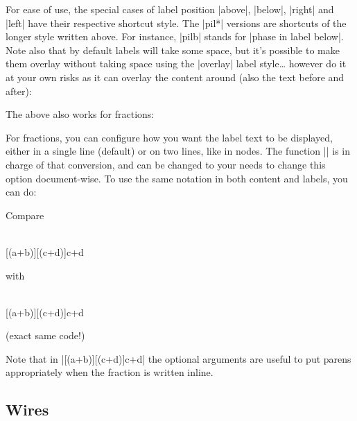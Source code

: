 \documentclass[a4paper]{ltxdoc}
\begin{document}
\begin{pgfmanualentry}
For ease of use, the special cases of label position |above|, |below|, |right| and |left| have their respective shortcut style. The |pil*| versions are shortcuts of the longer style written above. For instance, |pilb| stands for |phase in label below|. Note also that by default labels will take some space, but it's possible to make them overlay without taking space using the |overlay| label style\dots{} however do it at your own risks as it can overlay the content around (also the text before and after):
\begin{codeexample}[width=0pt]
  \zx{
    \zxZ[pilb]{\alpha+\beta} \rar & \zxX[pilb]{\gamma} \rar & \zxZ[pilb=overlay]{\gamma+\eta}
  }
\end{codeexample}
The above also works for fractions:
\begin{codeexample}[]
\end{codeexample}
For fractions, you can configure how you want the label text to be displayed, either in a single line (default) or on two lines, like in nodes. The function |\zxConvertToFracInLabel| is in charge of that conversion, and can be changed to your needs to change this option document-wise. To use the same notation in both content and labels, you can do:
\begin{codeexample}[width=0pt]
  Compare
  \begin{ZX}
     \dar \\
    [(a+b)][(c+d)]{c+d}
  \end{ZX} with
{
  \begin{ZX}
     \dar \\
    [(a+b)][(c+d)]{c+d}
  \end{ZX} (exact same code!)
}
\end{codeexample}
Note that in |[(a+b)][(c+d)]{c+d}| the optional arguments are useful to put parens appropriately when the fraction is written inline.
\end{pgfmanualentry}


\subsection{Wires}
\end{document}
